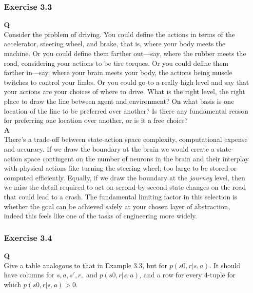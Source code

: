 \subsubsection{Exercise 3.3}
\textbf{Q}\\
Consider the problem of driving. You could define the actions in terms of the accelerator, steering wheel, and brake, that is, where your body meets the machine. Or you could define them farther out—say, where the rubber meets the road, considering your actions to be tire torques. Or you could define them farther in—say, where your brain meets your body, the actions being muscle twitches to control your limbs. Or you could go to a really high level and say that your actions are your choices of where to drive. What is the right level, the right place to draw the line between agent and environment? On what basis is one location of the line to be preferred over another? Is there any fundamental reason for preferring one location over another, or is it a free choice?\\

\textbf{A}\\
There's a trade-off between state-action space complexity, computational expense and accuracy. If we draw the boundary at the brain we would create a state-action space contingent on the number of neurons in the brain and their interplay with physical actions like turning the steering wheel; too large to be stored or computed efficiently. Equally, if we draw the boundary at the \textit{journey} level, then we miss the detail required to act on second-by-second state changes on the road that could lead to a crash. The fundamental limiting factor in this selection is whether the goal can be achieved safely at your chosen layer of abstraction, indeed this feels like one of the tasks of engineering more widely.

\subsubsection{Exercise 3.4}
\textbf{Q}\\
Give a table analogous to that in Example 3.3, but for \(p(s0, r|s, a)\). It should have columns for \(s, a, s', r,\) and \(p(s0, r|s, a)\), and a row for every 4-tuple for which \(p(s0, r|s, a) > 0\).\\

